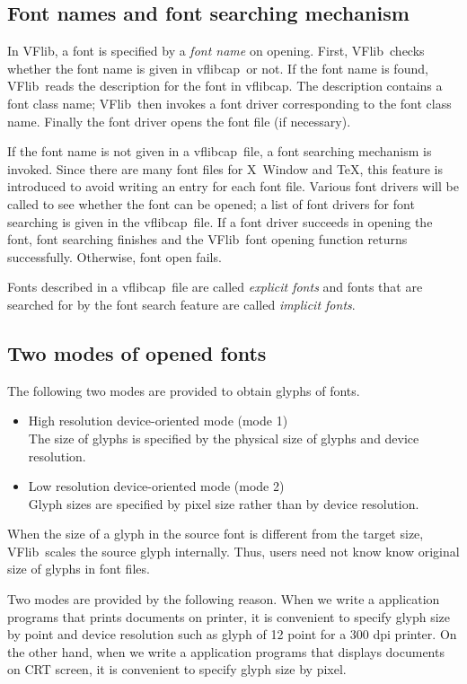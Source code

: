 \documentclass{cah-gut}
\newcommand{\pkg}[1]{\textsf{#1}}
\newcommand{\VFlib}{\pkg{VFlib}}
\newcommand{\vflibcap}{\pkg{vflibcap}}
\begin{document}
\subsection{Font names and font searching mechanism}

In \VFlib, a font is specified by a {\em font name} on opening.
First, \VFlib\ checks whether the font name is given in \vflibcap\ or
not.  If the font name is found, \VFlib\ reads the description for the
font in \vflibcap.  The description contains a font class name; \VFlib\ 
then invokes a font driver corresponding to the font class name.
Finally the font driver opens the font file (if necessary).

If the font name is not given in a \vflibcap\ file, a font searching
mechanism is invoked.  Since there are many font files for X~Window
and \TeX, this feature is introduced to avoid writing an entry for
each font file.  Various font drivers will be called to see whether
the font can be opened; a list of font drivers for font searching is
given in the \vflibcap\ file.  If a font driver succeeds in opening the
font, font searching finishes and the \VFlib\ font opening function
returns successfully.  Otherwise, font open fails.

Fonts described in a \vflibcap\ file are called {\em explicit fonts} and
fonts that are searched for by the font search feature are called {\em
  implicit fonts}.

\subsection{Two modes of opened fonts}

The following two modes are provided to obtain glyphs of fonts.
\begin{itemize}
\item High resolution device-oriented mode (mode 1)\\
  The size of glyphs is specified by the physical size of
  glyphs and device resolution. 
\item Low resolution device-oriented mode (mode 2)\\
  Glyph sizes are specified by pixel size rather than by
  device resolution.  
\end{itemize}
When the size of a glyph in the
source font is different from the target size, \VFlib\ scales the
source glyph internally.
Thus, users need not know know original size of glyphs in font files.

Two modes are provided by the following reason.
When we write a application programs that prints documents on printer, 
it is convenient to specify glyph size by point and device resolution
such as glyph of 12 point for a 300 dpi printer.
On the other hand, when we write a application programs 
that displays documents on CRT screen,
it is convenient to specify glyph size by pixel.
\end{document}
